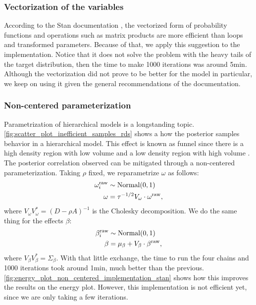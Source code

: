 \subsubsection*{Vectorization of the variables}

According to the Stan documentation \cite{stan2021vectorization}, the
vectorized form of probability functions and operations such as matrix
products are more efficient than loops and transformed parameters. Because of
that, we apply this suggestion to the implementation. Notice that it does not
solve the problem with the heavy tails of the target distribution, then the
time to make 1000 iterations was around 5min. Although the vectorization did
not prove to be better for the model in particular, we keep on using it given
the general recommendations of the documentation.

\subsubsection*{Non-centered parameterization}

Parametrization of hierarchical models is a longstanding topic.
\autoref{fig:scatter_plot_inefficient_samples_rds} shows a how the posterior
samples behavior in a hierarchical model. This effect is known as funnel since
there is a high density region with low volume and a low density region with
high volume \cite[p. 1]{betancourt2015hamiltonian}. The posterior correlation
observed can be mitigated through a non-centered parameterization. Taking
$\rho$ fixed, we reparametrize $\omega$ as follows:
\begin{equation*}
  \begin{split}
    \omega^{\mathrm{raw}}_i &\sim \operatorname{Normal}(0,1) \\
    \omega &= \tau^{-1/2}V_{\omega} \cdot \omega^{\mathrm{raw}},
  \end{split}
\end{equation*}
where $V_{\omega}V_{\omega}^{*} = (D - \rho A)^{-1}$ is the Cholesky decomposition. We do the
same thing for the effects $\beta$:
\begin{equation*}
  \begin{split}
    \beta^{\mathrm{raw}}_i &\sim \operatorname{Normal}(0,1) \\
    \beta &= \mu_{\beta} + V_{\beta} \cdot \beta^{\mathrm{raw}},
  \end{split}
\end{equation*}
where $V_{\beta}V_{\beta}^{*} = \Sigma_{\beta}$. With that little exchange,
the time to run the four chains and 1000 iterations took around 1min, much
better than the previous.
\autoref{fig:energy_plot_non_centered_implementation_stan} shows how this
improves the results on the energy plot. However, this implementation is not
efficient yet, since we are only taking a few iterations.

